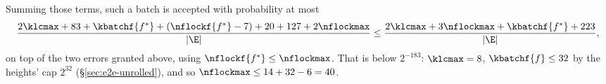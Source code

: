 Summing those terms, such a batch is accepted with probability at most
\[
\frac{2\klcmax+83+\kbatchf{f^\ast}+(\nflockf{f^\ast}-7)+20+127+2\nflockmax}{|\E|}\le\frac{2\klcmax+3\nflockmax+\kbatchf{f^\ast}+223}{|\E|},
\]
on top of the two errors granted above, using $\nflockf{f^\ast}\le\nflockmax$. That is below $2^{-183}$: $\klcmax=8$, $\kbatchf{f}\le32$ by the heights' cap $2^{32}$ (\S\ref{sec:e2e-unrolled}), and so $\nflockmax\le14+32-6=40$.
